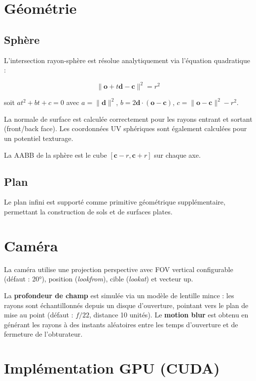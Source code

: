 \documentclass[12pt,a4paper]{article}
\begin{document}
\section{Géométrie}

\subsection{Sphère}

L'intersection rayon-sphère est résolue analytiquement via l'équation quadratique :

\[
\|\bm{o} + t\bm{d} - \bm{c}\|^2 = r^2
\]

soit $at^2 + bt + c = 0$ avec $a = \|\bm{d}\|^2$,
$b = 2\bm{d} \cdot (\bm{o} - \bm{c})$,
$c = \|\bm{o} - \bm{c}\|^2 - r^2$.

La normale de surface est calculée correctement pour les rayons entrant et sortant
(front/back face). Les coordonnées UV sphériques sont également calculées pour
un potentiel texturage.

La AABB de la sphère est le cube $[\bm{c} - r, \bm{c} + r]$ sur chaque axe.

\subsection{Plan}

Le plan infini est supporté comme primitive géométrique supplémentaire,
permettant la construction de sols et de surfaces plates.

\section{Caméra}

La caméra utilise une projection perspective avec FOV vertical configurable (défaut : 20°),
position (\textit{lookfrom}), cible (\textit{lookat}) et vecteur up.

La \textbf{profondeur de champ} est simulée via un modèle de lentille mince :
les rayons sont échantillonnés depuis un disque d'ouverture, pointant vers le plan
de mise au point (défaut : $f/22$, distance 10 unités).
Le \textbf{motion blur} est obtenu en générant les rayons à des instants aléatoires
entre les temps d'ouverture et de fermeture de l'obturateur.

\section{Implémentation GPU (CUDA)}
\end{document}
